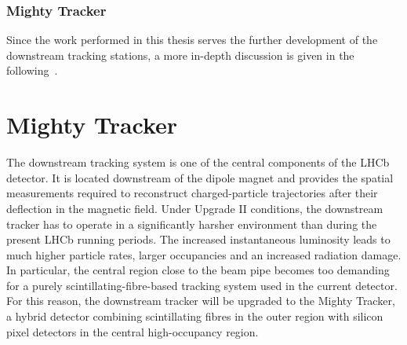 \subsubsection{Mighty Tracker}
Since the work performed in this thesis serves the further development of the downstream tracking stations, a more in-depth discussion is given in the following~.
%
%
\section{Mighty Tracker}\label{sec:mighty_tracker}
The downstream tracking system is one of the central components of the LHCb detector. It is located downstream of the dipole magnet and provides the spatial measurements required to reconstruct charged-particle trajectories after their deflection in the magnetic field. Under Upgrade II conditions, the downstream tracker has to operate in a significantly harsher environment than during the present LHCb running periods. The increased instantaneous luminosity leads to much higher particle rates, larger occupancies and an increased radiation damage. In particular, the central region close to the beam pipe becomes too demanding for a purely scintillating-fibre-based tracking system used in the current detector. For this reason, the downstream tracker will be upgraded to the Mighty Tracker, a hybrid detector combining scintillating fibres in the outer region with silicon pixel detectors in the central high-occupancy region\cite{Schmitz2026-je}.
%
